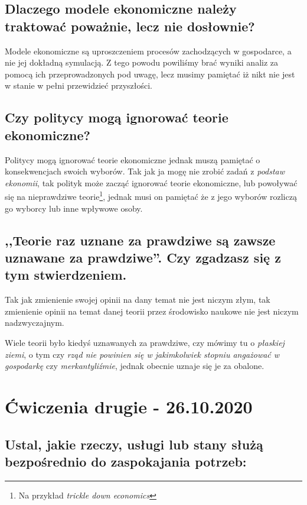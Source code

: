 \documentclass[a4paper,12pt]{article}
\begin{document}
\subsection{Dlaczego modele ekonomiczne należy traktować poważnie, lecz nie dosłownie?}

Modele ekonomiczne są uproszczeniem procesów zachodzących w gospodarce, a nie jej dokładną symulacją. Z tego powodu powiliśmy brać wyniki analiz za pomocą ich przeprowadzonych pod uwagę, lecz musimy pamiętać iż nikt nie jest w stanie w pełni przewidzieć przyszłości.

\subsection{Czy politycy mogą ignorować teorie ekonomiczne?}

Politycy mogą ignorować teorie ekonomiczne jednak muszą pamiętać o konsekwencjach swoich wyborów. Tak jak ja mogę nie zrobić zadań z \emph{podstaw ekonomii}, tak polityk może zacząć ignorować teorie ekonomiczne, lub powoływać się na nieprawdziwe teorie\footnote{Na przykład \emph{trickle down economics}}, jednak musi on pamiętać że z jego wyborów rozliczą go wyborcy lub inne wpływowe osoby.

\subsection{,,Teorie raz uznane za prawdziwe są zawsze uznawane za prawdziwe''. Czy zgadzasz się z tym stwierdzeniem.}

Tak jak zmienienie swojej opinii na dany temat nie jest niczym złym, tak zmienienie opinii na temat danej teorii przez środowisko naukowe nie jest niczym nadzwyczajnym.

Wiele teorii było kiedyś uznawanych za prawdziwe, czy mówimy tu o \emph{płaskiej ziemi}, o tym czy \emph{rząd nie powinien się w jakimkolwiek stopniu angażować w gospodarkę} czy \emph{merkantyliźmie}, jednak obecnie uznaje się je za obalone.

\section{Ćwiczenia drugie - 26.10.2020}

\subsection{Ustal, jakie rzeczy, usługi lub stany służą bezpośrednio do zaspokajania potrzeb:}
\end{document}

